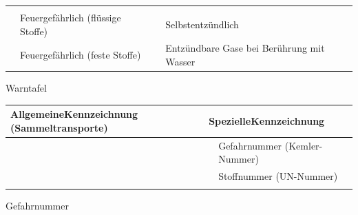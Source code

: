 \documentclass{article}
\begin{document}
\begin{flushleft}
\tablehead{}\begin{supertabular}{m{2.1599998cm}m{4.289cm}m{2.1599998cm}m{4.2840004cm}}
\par

 &
 &
 &
\\
{%
 \par}

 &
{\mdseries Feuergef\"ahrlich (fl\"ussige Stoffe)}

 &
{%
 \par}

 &
{\mdseries Selbstentz\"undlich}

\\
{%
 \par}

 &
{\mdseries Feuergef\"ahrlich (feste Stoffe)}

 &
{%
 \par}

 &
{\mdseries Entz\"undbare Gase bei Ber\"uhrung mit Wasser}

\\
\end{supertabular}
\end{flushleft}
{\mdseries\color{black}
Warntafel}

\begin{center}
\begin{tabular}{|m{3.225cm}m{3.225cm}|m{3.225cm}m{3.225cm}|}
\hline
\multicolumn{2}{|m{6.65cm}|}{\centering
{\bfseries\upshape\color[rgb]{0.0,0.0,0.5019608}
AllgemeineKennzeichnung (Sammeltransporte)}\par

} &
\multicolumn{2}{m{6.65cm}|}{\centering
{\bfseries\upshape\color[rgb]{0.0,0.0,0.5019608}
SpezielleKennzeichnung}\par

}\\\hline
{\par}

 &
 &
{\par}

 &
{\mdseries Gefahrnummer  (Kemler-Nummer)}

\\\hline
 &
 &
 &
{\mdseries Stoffnummer  (UN-Nummer)}

\\\hhline{~~~-}
\end{tabular}
\end{center}
{\mdseries\color{black}
Gefahrnummer}
\end{document}
